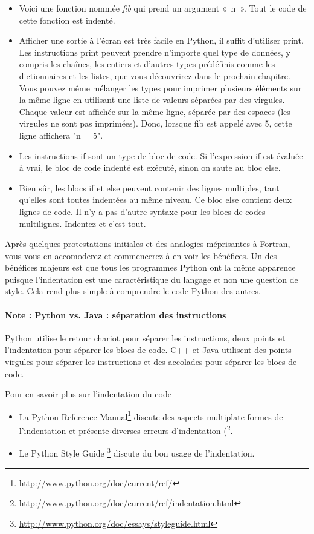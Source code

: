 \begin{itemize}
    \item{Voici une fonction nommée \emph{fib} qui prend un argument «~n~». Tout le code de cette fonction est indenté.}
    \item{Afficher une sortie à l'écran est très facile en Python, il suffit d'utiliser print. Les instructions print peuvent prendre n'importe quel type de données, y compris les chaînes, les entiers et d'autres types prédéfinis comme les dictionnaires et les listes, que vous découvrirez dans le prochain chapitre. Vous pouvez même mélanger les types pour imprimer plusieurs éléments sur la même ligne en utilisant une liste de valeurs séparées par des virgules. Chaque valeur est affichée sur la même ligne, séparée par des espaces (les virgules ne sont pas imprimées). Donc, lorsque fib est appelé avec 5, cette ligne affichera "n = 5".}
    \item{Les instructions if sont un type de bloc de code. Si l'expression if est évaluée à vrai, le bloc de code indenté est exécuté, sinon on saute au bloc else.}
    \item{Bien sûr, les blocs if et else peuvent contenir des lignes multiples, tant qu'elles sont toutes indentées au même niveau. Ce bloc else contient deux lignes de code. Il n'y a pas d'autre syntaxe pour les blocs de codes multilignes. Indentez et c'est tout.}
\end{itemize}

\medskip
Après quelques protestations initiales et des analogies méprisantes à Fortran, vous vous en accomoderez et commencerez à en voir les bénéfices. Un des bénéfices majeurs est que tous les programmes Python ont la même apparence puisque l'indentation est une caractéristique du langage et non une question de style. Cela rend plus simple à comprendre le code Python des autres.

\paragraph{Note : Python vs. Java : séparation des instructions}
Python utilise le retour chariot pour séparer les instructions, deux points et l'indentation pour séparer les blocs de code. C++ et Java utilisent des points-virgules pour séparer les instructions et des accolades pour séparer les blocs de code.

\medskip
\noindent Pour en savoir plus sur l'indentation du code
\begin{itemize}
    \item La Python Reference Manual\footnote{\url{http://www.python.org/doc/current/ref/}} discute des aspects multiplate-formes de l'indentation et présente diverses erreurs d'indentation (\footnote{\url{http://www.python.org/doc/current/ref/indentation.html}}.
    \item Le Python Style Guide \footnote{\url{http://www.python.org/doc/essays/styleguide.html}} discute du bon usage de l'indentation.
\end{itemize}

